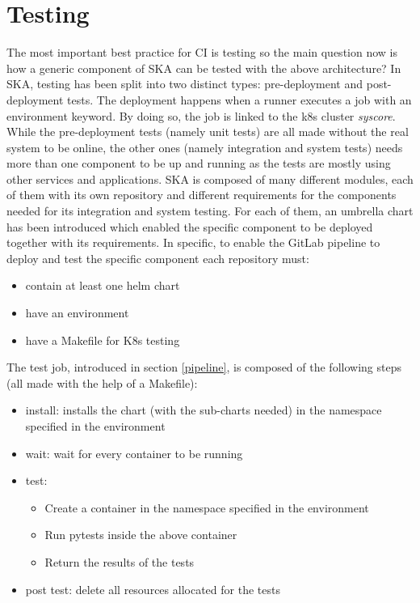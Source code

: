 \documentclass[a4paper]{spie}  %
\begin{document}
\section{Testing}
The most important best practice for CI is testing so the main question now is how a generic component of SKA can be tested with the above architecture?
In SKA, testing has been split into two distinct types: pre-deployment and post-deployment tests. The deployment happens when a runner executes a job with an environment keyword. By doing so, the job is linked to the k8s cluster \textit{syscore}.
While the pre-deployment tests (namely unit tests) are all made without the real system to be online, the other ones (namely integration and system tests) needs more than one component to be up and running as the tests are mostly using other services and applications.
SKA is composed of many different modules, each of them with its own repository and different requirements for the components needed for its integration and system testing. For each of them, an umbrella chart has been introduced which enabled the specific component to be deployed together with its requirements.
In specific, to enable the GitLab pipeline to deploy and test the specific component each repository must:
\begin{itemize}
    \item contain at least one helm chart
    \item have an environment
    \item have a Makefile for K8s testing
\end{itemize}

The test job, introduced in section \ref{pipeline}, is composed of the following steps (all made with the help of a Makefile):
\begin{itemize}
    \item install: installs the chart (with the sub-charts needed) in the namespace specified in the environment
    \item wait: wait for every container to be running
    \item test:
    \begin{itemize}
        \item Create a container in the namespace specified in the environment
        \item Run pytests inside the above container
        \item Return the results of the tests
    \end{itemize}
    \item post test: delete all resources allocated for the tests
\end{itemize}
\end{document}
